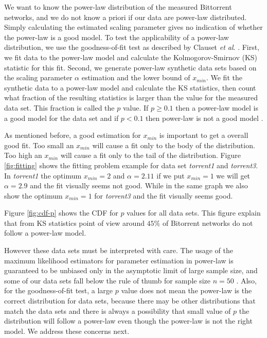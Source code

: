 \documentclass[10pt,conference,letterpaper]{IEEEtran}
\begin{document}
We want to know the power-law distribution of the measured Bittorrent networks, and we do not know a priori if our data are power-law distributed.
Simply calculating the estimated scaling parameter gives no indication of whether the power-law is a good model.  
To test the applicability of a power-law distribution, we use the goodness-of-fit test as described by Clauset \textit{et al}. \cite{clauset2009power}. 
First, we fit data to the power-law model and calculate the Kolmogorov-Smirnov (KS) statistic for this fit. 
Second, we generate power-law synthetic data sets based on the scaling parameter $\alpha$ estimation and the lower bound of $x_{min}$. 
We fit the synthetic data to a power-law model and calculate the KS statistics, then count what fraction of the resulting statistics is larger than the value for the measured data set. 
This fraction is called the $p$ value.  
If $p \geq 0.1$ then a power-law model is a good model for the data set and if $p < 0.1$ then power-law is not a good model \cite{clauset2009power}.

As mentioned before, a good estimation for $x_{min}$ is important to get a overall good fit.
Too small an $x_{min}$ will cause a fit only to the body of the distribution.
Too high an $x_{min}$ will cause a fit only to the tail of the distribution.
Figure \ref{fig:fitting} shows the fitting problem example for data set \emph{torrent1} and \emph{torrent3}.
In \emph{torrent1} the optimum $x_{min}=2$ and $\alpha=2.11$ if we put $x_{min}=1$ we will get $\alpha=2.9$ and the fit visually seems not good.
While in the same graph we also show the optimum $x_{min}=1$ for \emph{torrent3} and the fit visually seems good.

Figure  \ref{fig:cdf-p} shows the CDF for $p$ values for all data sets. 
This figure explain that from KS statistics point of view around $45\%$ of Bitorrent networks do not follow a power-law model.

However these data sets must be interpreted with care. 
The usage of the maximum likelihood estimators for parameter estimation in power-law is guaranteed to be unbiased only in the asymptotic limit of large sample size, and some of our data sets fall below the rule of thumb for sample size $n=50$ \cite{clauset2009power}. 
Also, for the goodness-of-fit test, a large $p$ value does not mean the power-law  is the correct distribution for data sets, because there may be other distributions that match the data sets and there is always a possibility that small value of $p$ the distribution will follow a power-law even though the power-law is not the right model\cite{clauset2009power}. 
We address these concerns next.
\end{document}
